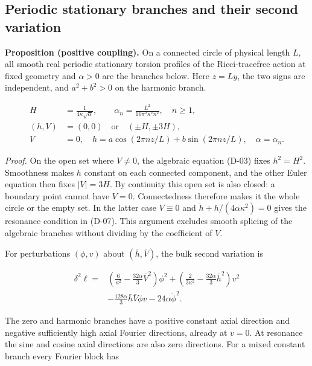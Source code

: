 \subsection{Periodic stationary branches and their second variation}

\textbf{Proposition (positive coupling).} On a connected circle of physical
length $L$, all smooth real periodic stationary torsion profiles of the
Ricci-tracefree action at fixed geometry and $\alpha>0$ are the branches below.
Here $z=Ly$, the two signs are independent, and $a^2+b^2>0$ on the harmonic branch.

\begin{equation}\tag{D-07}\label{eq:D-07}
\begin{aligned}
H&=\frac1{4\kappa\sqrt\alpha},\qquad
\alpha_n=\frac{L^2}{16\pi^2\kappa^2 n^2},\quad n\ge1,\\
(h,V)&=(0,0)\quad\text{or}\quad(\pm H,\pm3H),\\
V&=0,\quad h=a\cos(2\pi nz/L)+b\sin(2\pi nz/L),
\quad\alpha=\alpha_n.
\end{aligned}
\end{equation}

\emph{Proof.} On the open set where $V\ne0$, the algebraic equation (D-03)
fixes $h^2=H^2$. Smoothness makes $h$ constant on each connected component,
and the other Euler equation then fixes $|V|=3H$. By continuity this open set
is also closed: a boundary point cannot have $V=0$. Connectedness therefore
makes it the whole circle or the empty set. In the latter case $V\equiv0$
and $\ddot h+h/(4\alpha\kappa^2)=0$ gives the resonance condition in (D-07).
This argument excludes smooth splicing of the algebraic branches without
dividing by the coefficient of $V$.

For perturbations $(\phi,v)$ about $(\bar h,\bar V)$, the bulk second variation is

\begin{equation}\tag{D-08}\label{eq:D-08}
\begin{aligned}
\delta^2\ell={}&\left(\frac6{\kappa^2}-\frac{32\alpha}{3}\bar V^2\right)\phi^2
+\left(\frac2{3\kappa^2}-\frac{32\alpha}{3}\bar h^2\right)v^2\\
&-\frac{128\alpha}{3}\bar h\bar V\phi v-24\alpha\dot\phi^2.
\end{aligned}
\end{equation}

The zero and harmonic branches have a positive constant axial direction and
negative sufficiently high axial Fourier directions, already at $v=0$.
At resonance the sine and cosine axial directions are also zero directions.
For a mixed constant branch every Fourier block has

